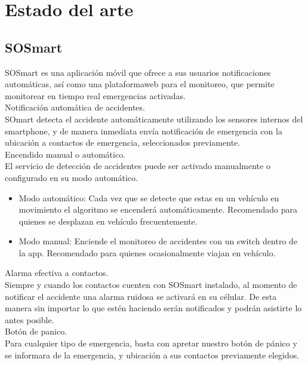 \section{Estado del arte}


\subsection{SOSmart}
SOSmart es una aplicación móvil que ofrece a sus usuarios notificaciones automáticas, así como una plataformaweb para el monitoreo, que permite monitorear en tiempo real emergencias activadas.\\

Notificación automática de accidentes.\\
SOmart detecta el accidente automáticamente utilizando los sensores internos del smartphone, y de manera inmediata envía notificación de emergencia con la ubicación a contactos de emergencia, seleccionados previamente.\\

Encendido manual o automático.\\
El servicio de detección de accidentes puede ser activado manualmente o configurado en su modo automático.
\begin{itemize}
	\item Modo automático: Cada vez que se detecte que estas en un vehículo en movimiento el algoritmo se encenderá automáticamente. Recomendado para quienes se desplazan en vehículo frecuentemente.
	
	\item Modo manual: Enciende el monitoreo de accidentes con un switch dentro de la app. Recomendado para quienes ocasionalmente viajan en vehículo.\\
\end{itemize}


Alarma efectiva a contactos.\\
Siempre y cuando los contactos cuenten con SOSmart instalado, al momento de notificar el accidente una alarma ruidosa se activará en su célular. De esta manera sin importar lo que estén haciendo serán notificados y podrán asistirte lo antes posible.\\

Botón de panico.\\
Para cualquier tipo de emergencia, basta con apretar nuestro botón de pánico y se informara de la emergencia, y ubicación a sus contactos previamente elegidos.\\


